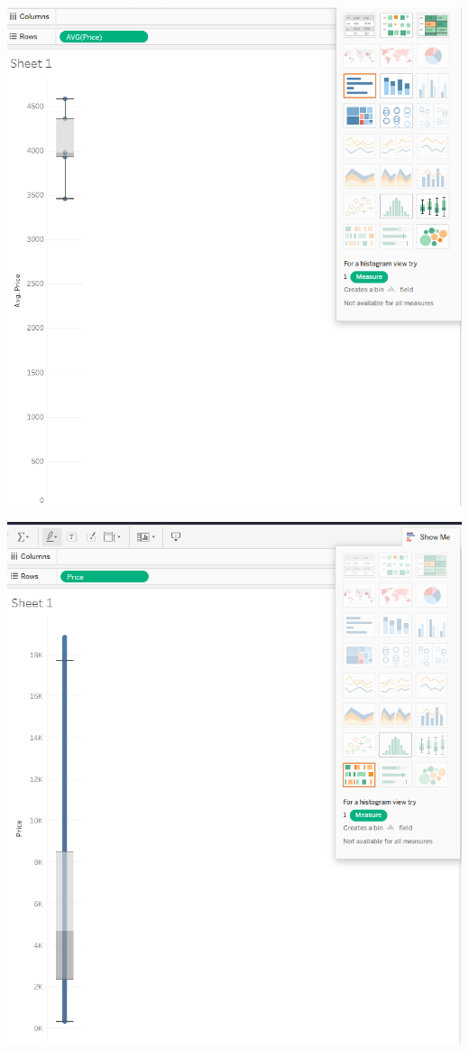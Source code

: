 \documentclass[
  letterpaper,
  DIV=11,
  numbers=noendperiod]{scrreprt}
\begin{document}
\includegraphics{Measure_ Boxplot_Price_per_Cut_Olufawo.png}

\includegraphics{Dimension_ Boxplot_Price_per_Cut_Olufawo.png}
\end{document}
